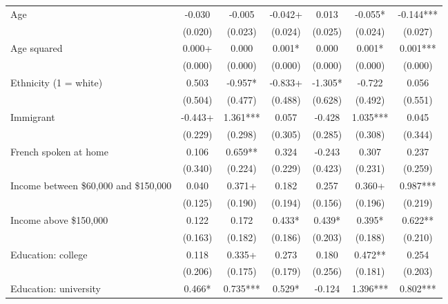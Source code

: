 \documentclass[
  letterpaper,
  DIV=11,
  numbers=noendperiod]{scrreprt}
\begin{document}
\begin{table}
\begin{tabular}[t]{lcccccc}
\hspace{1em}Age & -0.030 & -0.005 & -0.042+ & 0.013 & -0.055* & -0.144***\\
\hspace{1em} & (0.020) & (0.023) & (0.024) & (0.025) & (0.024) & (0.027)\\
\hspace{1em}Age squared & 0.000+ & 0.000 & 0.001* & 0.000 & 0.001* & 0.001***\\
\hspace{1em} & (0.000) & (0.000) & (0.000) & (0.000) & (0.000) & (0.000)\\
\hspace{1em}Ethnicity (1 = white) & 0.503 & -0.957* & -0.833+ & -1.305* & -0.722 & 0.056\\
\hspace{1em} & (0.504) & (0.477) & (0.488) & (0.628) & (0.492) & (0.551)\\
\hspace{1em}Immigrant & -0.443+ & 1.361*** & 0.057 & -0.428 & 1.035*** & 0.045\\
\hspace{1em} & (0.229) & (0.298) & (0.305) & (0.285) & (0.308) & (0.344)\\
\hspace{1em}French spoken at home & 0.106 & 0.659** & 0.324 & -0.243 & 0.307 & 0.237\\
\hspace{1em} & (0.340) & (0.224) & (0.229) & (0.423) & (0.231) & (0.259)\\
\hspace{1em}Income between \$60,000 and \$150,000 & 0.040 & 0.371+ & 0.182 & 0.257 & 0.360+ & 0.987***\\
\hspace{1em} & (0.125) & (0.190) & (0.194) & (0.156) & (0.196) & (0.219)\\
\hspace{1em}Income above \$150,000 & 0.122 & 0.172 & 0.433* & 0.439* & 0.395* & 0.622**\\
\hspace{1em} & (0.163) & (0.182) & (0.186) & (0.203) & (0.188) & (0.210)\\
\hspace{1em}Education: college & 0.118 & 0.335+ & 0.273 & 0.180 & 0.472** & 0.254\\
\hspace{1em} & (0.206) & (0.175) & (0.179) & (0.256) & (0.181) & (0.203)\\
\hspace{1em}Education: university & 0.466* & 0.735*** & 0.529* & -0.124 & 1.396*** & 0.802***\\

\end{tabular}
\end{table}
\end{document}
